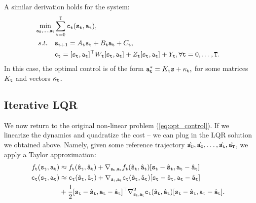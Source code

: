 A similar derivation holds for the system:
  \begin{equation*}\label{eq:lqr_full}
    \begin{split}
        \min_{{\tt a}_0,\dots,{\tt a}_{{\tt T}}} & \sum_{{\tt t}=0}^{\tt T} {\tt c}_{\tt t}({\tt s}_{\tt t}, {\tt a}_{\tt t}), \\
        s.t. \quad & {{\tt s}_{{\tt t}+1}} = A_{\tt t} {\tt s}_{\tt t} + B_{\tt t} {\tt a}_{\tt t} + C_{\tt t}, \\
        & {\tt c}_{\tt t} = [{\tt s}_{\tt t}, {\tt a}_{\tt t}]^\top W_{\tt t} [{\tt s}_{\tt t}, {\tt a}_{\tt t}] + Z_{\tt t} [{\tt s}_{\tt t}, {\tt a}_{\tt t}] + Y_{\tt t}, \forall {\tt t}=0,\dots,{\tt T}.
    \end{split}
\end{equation*}
In this case, the optimal control is of the form 
${\tt a}_{\tt t}^* = K_{\tt t} {\tt s} + \kappa_{\tt t}, $ for some matrices $K_{\tt t}$ and vectors  $\kappa_{\tt t}$.



\subsection{Iterative LQR}

We now return to the original non-linear problem (\ref{eq:opt_control}). If we linearize the dynamics and quadratize the cost -- we can plug in the LQR solution we obtained above. Namely, given some reference trajectory $\hat{{\tt s}_0},\hat{{\tt a}_0},\dots,\hat{{\tt s}_{\tt t}}, \hat{{\tt a}_{\tt T}}$, we apply a Taylor approximation:
\begin{equation}\label{eq:Taylor_approx}
\begin{split}
    {f_{\tt t}}({{\tt s}_{\tt t}},{{\tt a}_{\tt t}}) &\approx {f_{\tt t}}({\hat{{\tt s}}_{\tt t}},{\hat{{\tt a}}_{\tt t}}) + \nabla_{{\tt s}_{\tt t}, {\tt a}_{\tt t}}f_{\tt t}({\hat{{\tt s}}_{\tt t}},{\hat{{\tt a}}_{\tt t}}) [{\tt s}_{\tt t} - \hat{{\tt s}}_{\tt t}, {\tt a}_{\tt t} - \hat{{\tt a}}_{\tt t}] \\
    {{\tt c}_{\tt t}}({{\tt s}_{\tt t}},{{\tt a}_{\tt t}}) &\approx {{\tt c}_{\tt t}}({\hat{{\tt s}}_{\tt t}},{\hat{{\tt a}}_{\tt t}}) + \nabla_{{\tt s}_{\tt t}, {\tt a}_{\tt t}}{\tt c}_{\tt t}({\hat{{\tt s}}_{\tt t}},{\hat{{\tt a}}_{\tt t}}) [{\tt s}_{\tt t} - \hat{{\tt s}}_{\tt t}, {\tt a}_{\tt t} - \hat{{\tt a}}_{\tt t}] \\
    & + \frac{1}{2} [{\tt s}_{\tt t} - \hat{{\tt s}}_{\tt t}, {\tt a}_{\tt t} - \hat{{\tt a}}_{\tt t}]^\top \nabla^2_{{\tt s}_{\tt t}, {\tt a}_{\tt t}}{\tt c}_{\tt t}({\hat{{\tt s}}_{\tt t}},{\hat{{\tt a}}_{\tt t}}) [{\tt s}_{\tt t} - \hat{{\tt s}}_{\tt t}, {\tt a}_{\tt t} - \hat{{\tt a}}_{\tt t}].
\end{split}
\end{equation}

